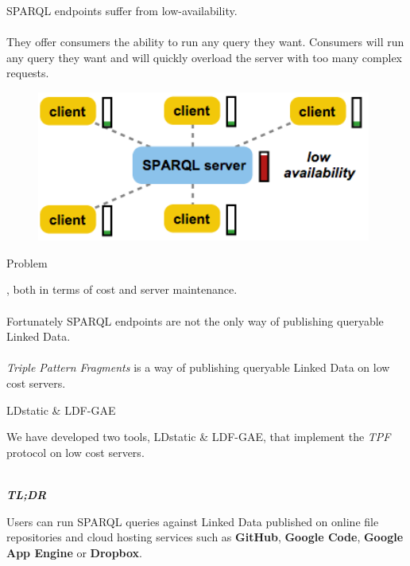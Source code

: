 \documentclass[20pt]{extarticle}
\begin{document}
{\fontsize{25}{25} {\cmr 
\noindent SPARQL endpoints {\color{blue}suffer from low-availability.}
\\ \\
They offer consumers the ability to run any query they want. Consumers will run any query they want and will quickly overload the server with too many complex requests.
}
\begin{figure}[ht!]
\centering
\includegraphics[width=110mm]{sparql.png}
\end{figure}



\newpage

 \begin{center}
{\fontsize{35}{35}\color{blue} \sc Problem}
\end{center}

\vspace{10 mm}

{\fontsize{30}{30} {\cmr 
{}, both in terms of cost and server maintenance.
\\ \\
Fortunately SPARQL endpoints are not the only way of publishing queryable Linked Data.
\\ \\
\textit{Triple Pattern Fragments} is a way of publishing queryable Linked Data on low cost servers.
}} 

\newpage


\begin{center}
{\fontsize{35}{35}\color{blue} \sc LDstatic \& LDF-GAE}
\end{center}
\vspace{20 mm}
{\fontsize{25}{25} {\cmr 
\noindent We have developed two tools, LDstatic \& LDF-GAE, that implement the \textit{TPF} protocol on low cost servers.
\\ \\
{\color{blue} 
\textbf{\textit{TL;DR}}

Users can run SPARQL queries against Linked Data published on online file repositories and cloud hosting services such as \textbf{GitHub}, \textbf{Google Code}, \textbf{Google App Engine} or \textbf{Dropbox}.
}
}} 


}
\end{document}
